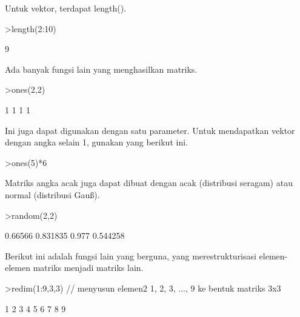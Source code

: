 \documentclass[a4paper,10pt]{article}
\begin{document}
\begin{eulernotebook}
\begin{eulercomment}
\begin{eulercomment}
\begin{eulercomment}
\begin{eulercomment}
\begin{eulercomment}
\begin{eulercomment}
\begin{eulercomment}
Untuk vektor, terdapat length().
\end{eulercomment}
\begin{eulerprompt}
>length(2:10)
\end{eulerprompt}
\begin{euleroutput}
  9
\end{euleroutput}
\begin{eulercomment}
Ada banyak fungsi lain yang menghasilkan matriks.
\end{eulercomment}
\begin{eulerprompt}
>ones(2,2)
\end{eulerprompt}
\begin{euleroutput}
              1             1 
              1             1 
\end{euleroutput}
\begin{eulercomment}
Ini juga dapat digunakan dengan satu parameter. Untuk mendapatkan
vektor dengan angka selain 1, gunakan yang berikut ini.
\end{eulercomment}
\begin{eulerprompt}
>ones(5)*6
\end{eulerprompt}
\begin{euleroutput}
  [6,  6,  6,  6,  6]
\end{euleroutput}
\begin{eulercomment}
Matriks angka acak juga dapat dibuat dengan acak (distribusi seragam)
atau normal (distribusi Gauß).
\end{eulercomment}
\begin{eulerprompt}
>random(2,2)
\end{eulerprompt}
\begin{euleroutput}
        0.66566      0.831835 
          0.977      0.544258 
\end{euleroutput}
\begin{eulercomment}
Berikut ini adalah fungsi lain yang berguna, yang merestrukturisasi
elemen-elemen matriks menjadi matriks lain.
\end{eulercomment}
\begin{eulerprompt}
>redim(1:9,3,3) // menyusun elemen2 1, 2, 3, ..., 9 ke bentuk matriks 3x3
\end{eulerprompt}
\begin{euleroutput}
              1             2             3 
              4             5             6 
              7             8             9 
\end{euleroutput}
\begin{eulercomment}

\end{eulercomment}
\end{eulercomment}
\end{eulercomment}
\end{eulercomment}
\end{eulercomment}
\end{eulercomment}
\end{eulercomment}
\end{eulernotebook}
\end{document}
